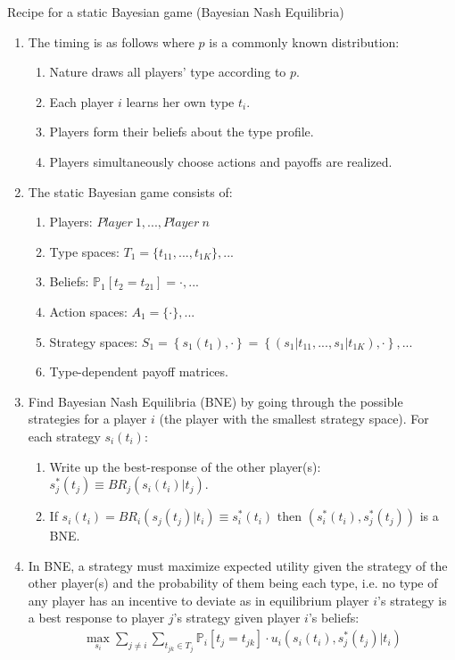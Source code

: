 \begin{frame}{Recipe for a static Bayesian game (Bayesian Nash Equilibria)}
    \begin{enumerate}
      \item The timing is as follows where $p$ is a commonly known distribution:
      \begin{enumerate}\normalsize
        \item Nature draws all players' type according to $p$.
        \item Each player $i$ learns her own type $t_{i}$.
        \item Players form their beliefs about the type profile.
        \item Players simultaneously choose actions and payoffs are realized.
      \end{enumerate}
      \item The static Bayesian game consists of:
      \begin{enumerate}\normalsize
        \item Players: $Player\ 1,...,Player\ n$
        \item Type spaces: $T_1=\{t_{11},...,t_{1K}\},...$
        \item Beliefs: $\mathbb{P}_1[t_2=t_{21}]=\cdot,...$
        \item Action spaces: $A_1=\{\cdot\},...$
        \item Strategy spaces: $S_1=\left\{s_1(t_1),\cdot\right\}=\left\{(s_1|t_{11},...,s_1|t_{1K}),\cdot\right\},...$
        \item Type-dependent payoff matrices.
      \end{enumerate}
      \item Find Bayesian Nash Equilibria (BNE) by going through the possible strategies for a player $i$ (the player with the smallest strategy space). For each strategy $s_i(t_i)$:
      \begin{enumerate}\normalsize
        \item Write up the best-response of the other player(s): $s_j^*(t_j)\equiv BR_j\left(s_i(t_i)|t_j\right)$.
        \item If $s_i(t_i)=BR_i\left(s_j(t_j)|t_i\right)\equiv s_i^*(t_i)$ then $\left(s_i^*(t_i),s_j^*(t_j)\right)$ is a BNE.
      \end{enumerate}
      \item In BNE, a strategy must maximize expected utility given the strategy of the other player(s) and the probability of them being each type, i.e. no type of any player has an incentive to deviate as in equilibrium player $i$'s strategy is a best response to player $j$'s strategy given player $i$'s beliefs:
      \begin{align*}
        \max\limits_{s_i}\sum\limits_{j\neq i}\sum\limits_{t_{jk}\in T_j}\mathbb{P}_i[t_j=t_{jk}]\cdot u_i\left(s_i(t_i),s_j^*(t_j)|t_i\right)
      \end{align*}
    \end{enumerate}
    \vfill\null
\end{frame}

